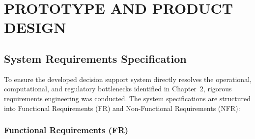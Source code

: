 \chapter{PROTOTYPE AND PRODUCT DESIGN}

\section{System Requirements Specification}

To ensure the developed decision support system directly resolves the operational, computational, and regulatory bottlenecks identified in Chapter~2, rigorous requirements engineering was conducted. The system specifications are structured into Functional Requirements (FR) and Non-Functional Requirements (NFR):

\subsection{Functional Requirements (FR)}
